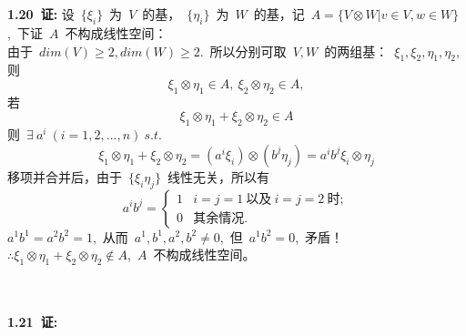 \noindent
\\
\\
{\textbf{1.20\ 证:}}
设\ $\{\xi_i\}$\ 为\ $V$\ 的基，\ $\{\eta_i\}$\ 为\ $W$\ 的基，记\ $A=\{V\otimes W|v\in V,w\in W \}$,\ 下证\ $A$\ 不构成线性空间：
\\
由于\ $dim(V)\geqslant 2,dim(W)\geqslant 2$.\ 所以分别可取\ $V,W$\ 的两组基：\ $\xi_1,\xi_2,\eta_1,\eta_2$,则
$$\xi_1\otimes \eta_1\in A,\ \xi_2\otimes\eta_2\in A,$$
若$$\xi_1\otimes\eta_1+\xi_2\otimes\eta_2\in A$$
则\ $\exists\  a^i\ (i=1,2,...,n)\ s.t.\ $
$$\xi_1\otimes \eta_1+\xi_2\otimes\eta_2=(a^i\xi_i)\otimes (b^j\eta_j )=a^ib^j\xi_i\otimes\eta_j$$
移项并合并后，由于\ $\{\xi_i\eta_j\}$\ 线性无关，所以有
\begin{displaymath}
a^ib^j=\left\lbrace \begin{array}{lll}
                      1 & i=j=1\ \text{以及}\ i=j=2\ \text{时};
                      \\
                      0 & \text{其余情况}.    
                     \end{array}
        \right.
\end{displaymath}
$a^1b^1=a^2b^2=1$,\ 从而\ $a^1,b^1,a^2,b^2\neq 0$,\ 但\ $a^1b^2=0$,\ 矛盾！
\\
$\therefore \xi_1\otimes\eta_1+\xi_2\otimes\eta_2\notin A$,\ $A$\ 不构成线性空间。


\noindent
\\
\\
{\textbf{1.21\ 证:}} 

